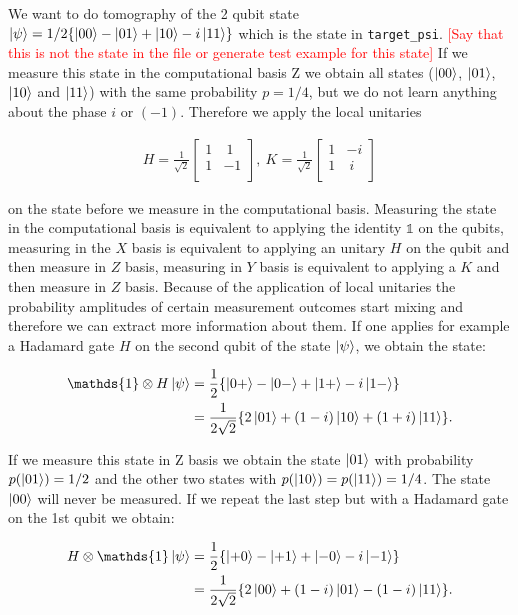 \documentclass[submission, Phys]{SciPost}
\begin{document}
We want to do tomography of the 2 qubit state $\ket{\psi} = 1/2 \{ \ket{00} - \ket{01} + \ket{10} - i \ket{11} \}$ which is the state in \verb|target_psi|. \textcolor{red}{[Say that this is not the state in the file or generate test example for this state]}
If we measure this state in the computational basis Z we obtain all states ($\ket{00}$, $\ket{01}$, $\ket{10}$ and $\ket{11}$) with the same probability $p = 1/4$, but we do not learn anything about the phase $i$ or $(-1)$. 
Therefore we apply the local unitaries

\begin{align}
H = \frac{1}{\sqrt{2}} 
\begin{bmatrix}
1 &~1 \\
1 &-1 \\ 
\end{bmatrix},~
K = \frac{1}{\sqrt{2}} 
\begin{bmatrix}
1 &-i \\
1 &~i \\ 
\end{bmatrix}
\end{align} 

 on the state before we measure in the computational basis. Measuring the state in the computational basis is equivalent to applying the identity $\mathds{1}$ on the qubits, measuring in the $X$ basis is equivalent to applying an unitary $H$ on the qubit and then measure in $Z$ basis, measuring in $Y$ basis is equivalent to applying a $K$ and then measure in $Z$ basis. Because of the application of local unitaries the probability amplitudes of certain measurement outcomes start mixing and therefore we can extract more information about them.  If one applies for example a Hadamard gate $H$ on the second qubit of the state $\ket{\psi}$, we obtain the state:

\begin{align}
\mathds{1} \otimes H \ket{\psi} &= \frac{1}{2} \{ \ket{0+} - \ket{0-} + \ket{1+} - i \ket{1-} \} \\
&=  \frac{1}{2 \sqrt{2}} \{ 2 \ket{01} + (1-i)\ket{10} + (1+i)\ket{11} \}. 
\end{align}

If we measure this state in Z basis we obtain the state $\ket{01}$ with probability $p(\ket{01}) = 1/2$ and the other two states with $p(\ket{10}) = p(\ket{11}) = 1/4$. The state $\ket{00}$ will never be measured. If we repeat the last step but with a Hadamard gate on the 1st qubit we obtain:

\begin{align}
H  \otimes \mathds{1} \ket{\psi} &= \frac{1}{2} \{ \ket{+0} - \ket{+1} + \ket{-0} - i \ket{-1} \} \\
&=  \frac{1}{2 \sqrt{2}} \{ 2 \ket{00} + (1-i)\ket{01} - (1-i)\ket{11} \}. 
\end{align}
\end{document}

